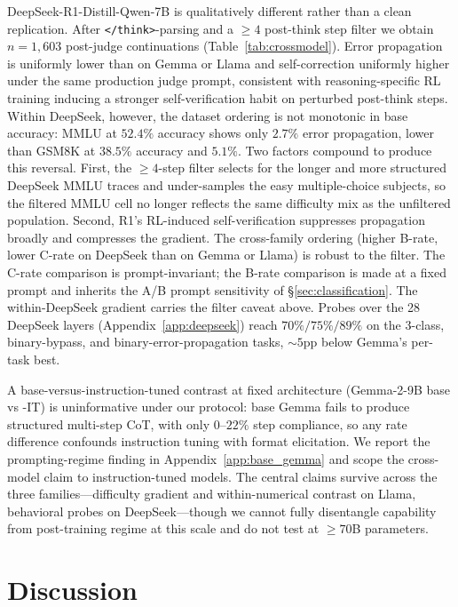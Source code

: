 \documentclass[10pt]{article} %
\begin{document}
DeepSeek-R1-Distill-Qwen-7B \citep{deepseek2025} is qualitatively different rather than a clean replication. After \texttt{</think>}-parsing and a $\geq 4$ post-think step filter we obtain $n = 1{,}603$ post-judge continuations (Table~\ref{tab:crossmodel}). Error propagation is uniformly lower than on Gemma or Llama and self-correction uniformly higher under the same production judge prompt, consistent with reasoning-specific RL training inducing a stronger self-verification habit on perturbed post-think steps. Within DeepSeek, however, the dataset ordering is not monotonic in base accuracy: MMLU at $52.4\%$ accuracy shows only $2.7\%$ error propagation, lower than GSM8K at $38.5\%$ accuracy and $5.1\%$. Two factors compound to produce this reversal. First, the $\geq 4$-step filter selects for the longer and more structured DeepSeek MMLU traces and under-samples the easy multiple-choice subjects, so the filtered MMLU cell no longer reflects the same difficulty mix as the unfiltered population. Second, R1's RL-induced self-verification suppresses propagation broadly and compresses the gradient. The cross-family ordering (higher B-rate, lower C-rate on DeepSeek than on Gemma or Llama) is robust to the filter. The C-rate comparison is prompt-invariant; the B-rate comparison is made at a fixed prompt and inherits the A/B prompt sensitivity of \S\ref{sec:classification}. The within-DeepSeek gradient carries the filter caveat above. Probes over the 28 DeepSeek layers (Appendix~\ref{app:deepseek}) reach $70\% / 75\% / 89\%$ on the 3-class, binary-bypass, and binary-error-propagation tasks, $\sim 5$pp below Gemma's per-task best.

A base-versus-instruction-tuned contrast at fixed architecture (Gemma-2-9B base vs -IT) is uninformative under our protocol: base Gemma fails to produce structured multi-step CoT, with only $0$--$22\%$ step compliance, so any rate difference confounds instruction tuning with format elicitation. We report the prompting-regime finding in Appendix~\ref{app:base_gemma} and scope the cross-model claim to instruction-tuned models. The central claims survive across the three families---difficulty gradient and within-numerical contrast on Llama, behavioral probes on DeepSeek---though we cannot fully disentangle capability from post-training regime at this scale and do not test at $\geq 70$B parameters.


\section{Discussion}
\label{sec:discussion}
\end{document}
